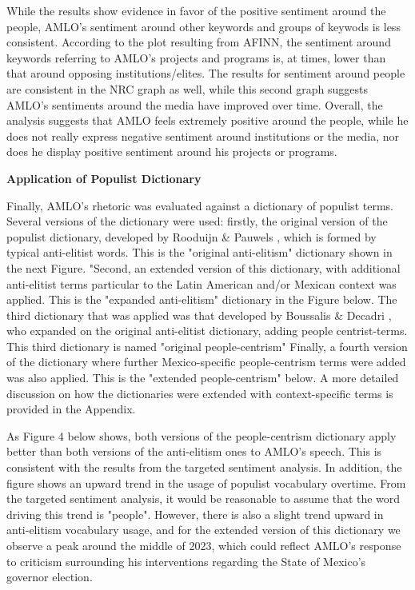\documentclass[]{article}
\begin{document}
While the results show evidence in favor of the positive sentiment around the people, AMLO's sentiment around other keywords and groups of keywods is less consistent. According to the plot resulting from AFINN, the sentiment around keywords referring to AMLO's projects and programs is, at times, lower than that around opposing institutions/elites. The results for sentiment around people are consistent in the NRC graph as well, while this second graph suggests AMLO's sentiments around the media have improved over time. Overall, the analysis suggests that AMLO feels extremely positive around the people, while he does not really express negative sentiment around institutions or the media, nor does he display positive sentiment around his projects or programs.

\vspace{.5cm}
\noindent\textbf{Application of Populist Dictionary}
\vspace{.5cm}

\noindent Finally, AMLO's rhetoric was evaluated against a dictionary of populist terms. Several versions of the dictionary were used: firstly, the original version of the populist dictionary, developed by Rooduijn \& Pauwels \cite{rooduijn_measuring_2011}, which is formed by typical anti-elitist words. This is the "original anti-elitism" dictionary shown in the next Figure. "Second, an extended version of this dictionary, with additional anti-elitist terms particular to the Latin American and/or Mexican context was applied. This is the "expanded anti-elitism" dictionary in the Figure below. The third dictionary that was applied was that developed by Boussalis \& Decadri \cite{decadri_populism_2020}, who expanded on the original anti-elitist dictionary, adding people centrist-terms. This third dictionary is named "original people-centrism" Finally, a fourth version of the dictionary where further Mexico-specific people-centrism terms were added was also applied. This is the "extended people-centrism" below. A more detailed discussion on how the dictionaries were extended with context-specific terms is provided in the Appendix. 

As Figure 4 below shows, both versions of the people-centrism dictionary apply better than both versions of the anti-elitism ones to AMLO's speech. This is consistent with the results from the targeted sentiment analysis. In addition, the figure shows an upward trend in the usage of populist vocabulary overtime. From the targeted sentiment analysis, it would be reasonable to assume that the word driving this trend is "people". However, there is also a slight trend upward in anti-elitism vocabulary usage, and for the extended version of this dictionary we observe a peak around the middle of 2023, which could reflect AMLO's response to criticism surrounding his interventions regarding the State of Mexico's governor election. 
\end{document}

